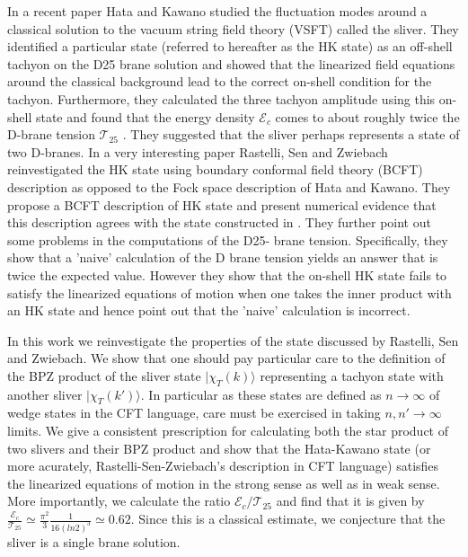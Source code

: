 \documentclass[a4paper,12pt]{article}
\begin{document}
In a recent paper \cite{hk} Hata and Kawano studied the fluctuation modes
around a classical solution to the vacuum string field theory (VSFT) called the
sliver. They identified a particular state (referred to hereafter as the HK
state) as an off-shell tachyon on the D25 brane solution and showed that
the linearized field equations around the classical background lead to the
correct on-shell condition for the tachyon. Furthermore, they calculated
the three tachyon amplitude using this on-shell state and found that the
energy density ${\mathcal E}_c$ comes to about roughly twice the D-brane
tension ${\mathcal T}_{25}$ \cite{hk}. They suggested that the sliver
perhaps
represents a state of two D-branes. In a very interesting paper \cite{rsz1}
Rastelli, Sen and Zwiebach reinvestigated the HK state using boundary
conformal field theory (BCFT) description as opposed to the Fock space
 description of Hata and Kawano. They propose a BCFT description of HK state
and present numerical evidence that this description agrees with the state
constructed in \cite{hk}. They further point out some problems in
the computations of the D25- brane tension. Specifically, they show that a
'naive' calculation of the D brane tension yields an answer that is twice
the expected value. However they show that the on-shell HK state fails to
satisfy the linearized equations of motion when one takes the inner product
with an HK state and hence point out that the 'naive' calculation is
incorrect.

In this work we reinvestigate the properties of the state discussed by
Rastelli, Sen
and Zwiebach. We show that one should pay particular care to the definition
of the BPZ product of the sliver state $|\chi_T(k)\rangle$ representing
a tachyon state with another sliver $|\chi_T(k')\rangle$. In particular
as these states are defined as $n\to\infty$ of wedge states in the CFT
language, care must be  exercised
in taking $n,n'\to\infty$ limits. We give a
consistent prescription for calculating both the star product of two slivers
and their BPZ product and show that the Hata-Kawano state (or more acurately,
Rastelli-Sen-Zwiebach's description in CFT language) satisfies the
linearized equations of motion in the strong sense as well as in weak sense.
More importantly, we calculate the ratio ${\mathcal E}_c/{\mathcal T}_{25}$
and find that it is given by
$\frac{{\mathcal E}_c}{{\mathcal T}_{25}}\simeq
\frac{\pi^2}{3}\frac{1}{16(ln2)^3}\simeq 0.62$.  Since this is a classical 
estimate, we conjecture that the sliver is a single brane solution.
\end{document}
